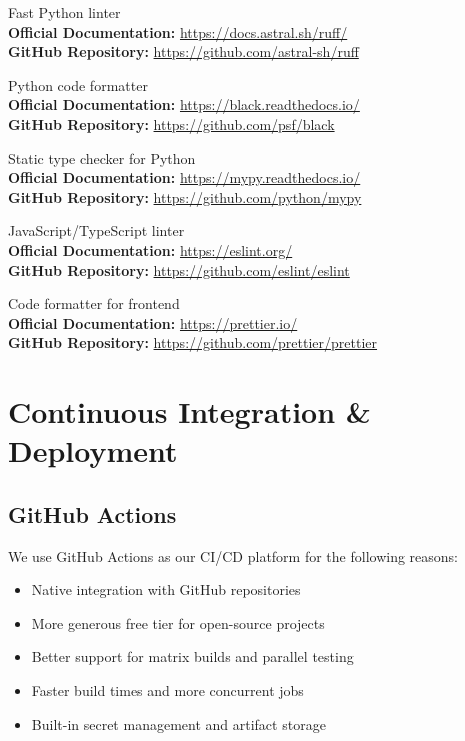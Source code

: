 \documentclass[12pt,a4paper]{article}
\begin{document}
\begin{description}[style=nextline]
    \item[Ruff] Fast Python linter \\
    \textbf{Official Documentation:} \url{https://docs.astral.sh/ruff/} \\
    \textbf{GitHub Repository:} \url{https://github.com/astral-sh/ruff}
    
    \item[Black] Python code formatter \\
    \textbf{Official Documentation:} \url{https://black.readthedocs.io/} \\
    \textbf{GitHub Repository:} \url{https://github.com/psf/black}
    
    \item[MyPy] Static type checker for Python \\
    \textbf{Official Documentation:} \url{https://mypy.readthedocs.io/} \\
    \textbf{GitHub Repository:} \url{https://github.com/python/mypy}
    
    \item[ESLint] JavaScript/TypeScript linter \\
    \textbf{Official Documentation:} \url{https://eslint.org/} \\
    \textbf{GitHub Repository:} \url{https://github.com/eslint/eslint}
    
    \item[Prettier] Code formatter for frontend \\
    \textbf{Official Documentation:} \url{https://prettier.io/} \\
    \textbf{GitHub Repository:} \url{https://github.com/prettier/prettier}
\end{description}

\section{Continuous Integration \& Deployment}

\subsection{GitHub Actions}

We use GitHub Actions as our CI/CD platform for the following reasons:
\begin{itemize}
    \item Native integration with GitHub repositories
    \item More generous free tier for open-source projects
    \item Better support for matrix builds and parallel testing
    \item Faster build times and more concurrent jobs
    \item Built-in secret management and artifact storage
\end{itemize}
\end{document}
